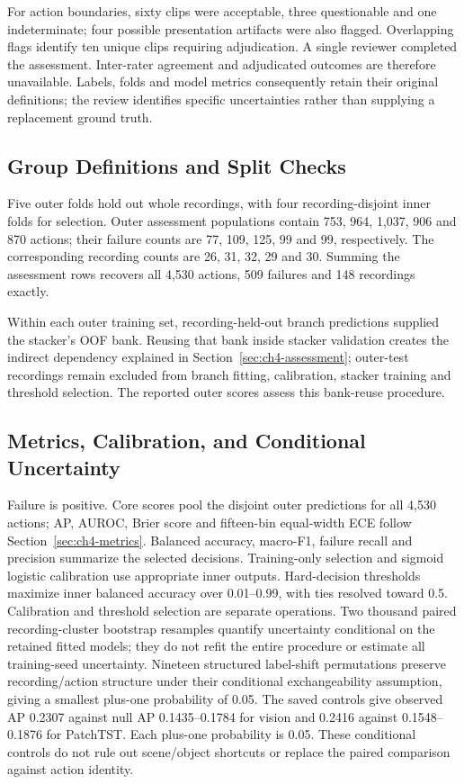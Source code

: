 For action boundaries, sixty clips were acceptable, three questionable and one
indeterminate; four possible presentation artifacts were also flagged. Overlapping flags
identify ten unique clips requiring adjudication. A single reviewer completed the
assessment. Inter-rater agreement and adjudicated outcomes are therefore unavailable.
Labels, folds and model metrics consequently retain their original definitions; the
review identifies specific uncertainties rather than supplying a replacement ground
truth.

\subsection{Group Definitions and Split Checks}
Five outer folds hold out whole recordings, with four recording-disjoint inner folds for
selection. Outer assessment populations contain 753, 964, 1,037, 906 and 870 actions;
their failure counts are 77, 109, 125, 99 and 99, respectively. The corresponding
recording counts are 26, 31, 32, 29 and 30. Summing the assessment rows recovers all
4,530 actions, 509 failures and 148 recordings exactly.

Within each outer training set, recording-held-out branch predictions supplied the
stacker's OOF bank. Reusing that bank inside stacker validation creates the indirect
dependency explained in Section~\ref{sec:ch4-assessment}; outer-test recordings remain
excluded from branch fitting, calibration, stacker training and threshold selection.
The reported outer scores assess this bank-reuse procedure.

\subsection{Metrics, Calibration, and Conditional Uncertainty}
Failure is positive. Core scores pool the disjoint outer predictions for all 4,530
actions; AP, AUROC, Brier score and fifteen-bin equal-width ECE follow
Section~\ref{sec:ch4-metrics}. Balanced accuracy, macro-F1, failure recall and precision
summarize the selected decisions. Training-only selection and sigmoid logistic calibration use
appropriate inner outputs. Hard-decision thresholds maximize inner balanced accuracy
over 0.01--0.99, with ties resolved toward 0.5. Calibration and threshold selection are
separate operations. Two thousand paired recording-cluster bootstrap resamples quantify
uncertainty conditional on the retained fitted models; they do not refit the entire
procedure or estimate all training-seed uncertainty. Nineteen structured label-shift
permutations preserve recording/action structure under their conditional exchangeability
assumption, giving a smallest plus-one probability of 0.05. The saved controls give observed AP
0.2307 against null AP 0.1435--0.1784 for vision and 0.2416 against 0.1548--0.1876
for PatchTST. Each plus-one probability is 0.05. These conditional controls do not rule
out scene/object shortcuts or replace the paired comparison against action identity.

